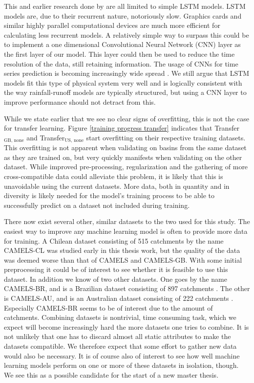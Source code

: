  This and earlier research done by \citet{lstm_first_paper,lstm_second_paper,lstm_third_paper} 
 are all limited to simple LSTM models. LSTM models are, due to their recurrent nature, 
notoriously slow. Graphics cards and similar highly parallel computational devices 
are much more efficient for calculating less recurrent models. A relatively 
simple way to surpass this could be to implement a one dimensional 
Convolutional Neural Network (CNN) layer as the first layer of our model. This 
layer could then be used to reduce the time resolution of the data, still retaining 
information. The usage of CNNs for time series prediction is becoming increasingly
wide spread \citationneeded. We still argue that LSTM models fit this type of 
physical system very well and is logically consistent with the way rainfall-runoff 
models are typically structured, but using a CNN layer to improve performance 
should not detract from this.

While we state earlier that we see no clear signs of overfitting, this is not 
the case for transfer learning. Figure 
\ref{training progress transfer} indicates that Transfer$_\text{GB, none}$ 
and Transfer$_\text{US, none}$ start overfitting on their respective training 
datasets. This overfitting is not apparent when validating on basins from the 
same dataset as they are trained on, but very quickly manifests when validating 
on the other dataset. While improved pre-processing, regularization and the gathering 
of more  cross-compatible data could alleviate this problem, it is likely that this is 
unavoidable using the current datasets. More data, both in quantity and in 
diversity is likely needed for the model's training process to be able to 
successfully predict on a dataset not included during training.

There now exist several other, similar datasets to the two used for this study. 
The easiest way to improve 
any machine learning model is often to provide more data for training. A Chilean 
dataset consisting of 515 catchments by the name CAMELS-CL \citep{CAMELS_CL} 
was studied early in this thesis work, but the quality 
of the data was deemed worse than that of CAMELS and CAMELS-GB. With some initial 
preprocessing it could be of interest to see whether it is feasible to use this 
dataset.
In addition we know of two other datasets. One goes by the name CAMELS-BR, and is 
a Brazilian dataset consisting of 897 catchments \citep{CAMELS_BR}.
The other is CAMELS-AU, and is an Australian dataset consisting of 222 catchments
 \citep{CAMELS_AU}. Especially CAMELS-BR seems to be of interest due to the 
amount of catchments. Combining datasets is nontrivial, time consuming task, which 
we expect will become increasingly hard the more datasets one tries to combine. 
It is not unlikely that one has to discard almost all static attributes to make 
the datasets compatible. We therefore expect that some effort to gather new data 
would also be necessary. It is of course also of interest to see how well machine 
learning models perform on one or more of these datasets in isolation, though. 
We see this as a possible candidate for the start of a new master thesis.

